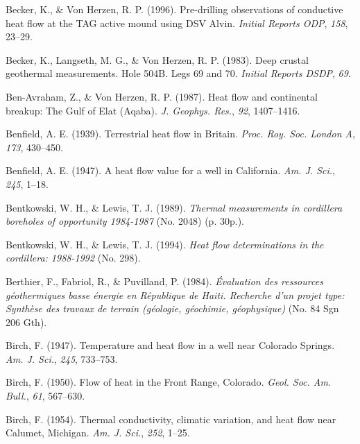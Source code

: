\begin{CSLReferences}{1}{1}
\leavevmode{}%
Becker, K., \& Von Herzen, R. P. (1996). Pre-drilling observations of conductive heat flow at the TAG active mound using DSV {Alvin}. \emph{Initial Reports ODP}, \emph{158}, 23--29.

\leavevmode{}%
Becker, K., Langseth, M. G., \& Von Herzen, R. P. (1983). Deep crustal geothermal measurements. Hole 504B. Legs 69 and 70. \emph{Initial Reports DSDP}, \emph{69}.

\leavevmode{}%
Ben-Avraham, Z., \& Von Herzen, R. P. (1987). Heat flow and continental breakup: The {Gulf of Elat (Aqaba)}. \emph{J. Geophys. Res.}, \emph{92}, 1407--1416.

\leavevmode{}%
Benfield, A. E. (1939). Terrestrial heat flow in {Britain}. \emph{Proc. Roy. Soc. London A}, \emph{173}, 430--450.

\leavevmode{}%
Benfield, A. E. (1947). A heat flow value for a well in {California}. \emph{Am. J. Sci.}, \emph{245}, 1--18.

\leavevmode{}%
Bentkowski, W. H., \& Lewis, T. J. (1989). \emph{Thermal measurements in cordillera boreholes of opportunity 1984-1987} (No. 2048) (p. 30p.).

\leavevmode{}%
Bentkowski, W. H., \& Lewis, T. J. (1994). \emph{Heat flow determinations in the cordillera: 1988-1992} (No. 298).

\leavevmode{}%
Berthier, F., Fabriol, R., \& Puvilland, P. (1984). \emph{Évaluation des ressources géothermiques basse énergie en {République} de {Haiti}. {Recherche} d'un projet type: Synthèse des travaux de terrain (géologie, géochimie, géophysique)} (No. 84 Sgn 206 Gth).

\leavevmode{}%
Birch, F. (1947). Temperature and heat flow in a well near {Colorado Springs}. \emph{Am. J. Sci.}, \emph{245}, 733--753.

\leavevmode{}%
Birch, F. (1950). Flow of heat in the {Front Range, Colorado}. \emph{Geol. Soc. Am. Bull.}, \emph{61}, 567--630.

\leavevmode{}%
Birch, F. (1954). Thermal conductivity, climatic variation, and heat flow near {Calumet, Michigan}. \emph{Am. J. Sci.}, \emph{252}, 1--25.


\end{CSLReferences}
